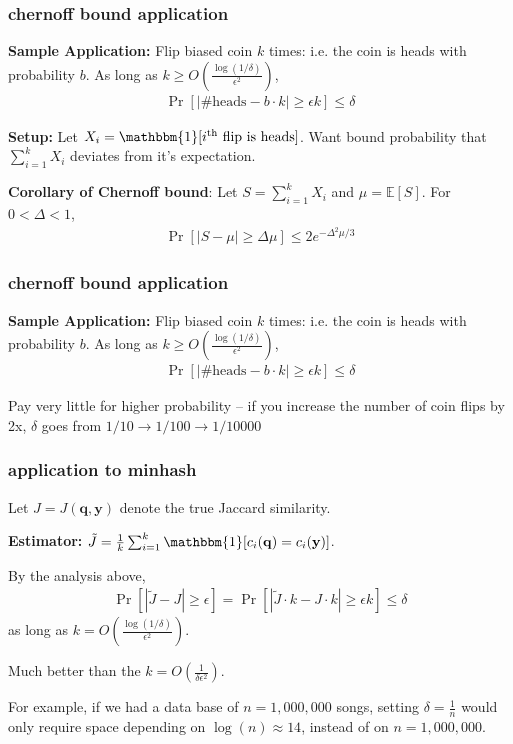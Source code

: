 \documentclass[handout,compress]{beamer}
\newcommand{\bv}[1]{\mathbf{#1}}
\newcommand{\E}{\mathbb{E}}
\begin{document}
\begin{frame}
	\frametitle{chernoff bound application}
	\small
	\textbf{Sample Application:} Flip biased coin $k$ times: i.e. the coin is heads with probability $b$. As long as $k \geq O\left(\frac{\log(1/\delta)}{\epsilon^2}\right)$,
	\vspace{-.5em}
	\begin{align*}
		\Pr[|\text{\# heads} - b\cdot k| \geq \epsilon k] \leq \delta 
	\end{align*}
	
	\textbf{Setup:}
	Let $X_i = \mathbbm{1}[i^\text{th} \text{ flip is heads}]$. Want bound probability that  $\sum_{i=1}^k X_i$ deviates from it's expectation.
	
	\textbf{Corollary of Chernoff bound}: Let $S = \sum_{i=1}^k X_i$ and $\mu = \E[S]$. For $0< \Delta < 1$, 
	\vspace{-.75em}
	\begin{align*}
		\Pr[|S - \mu| \geq \Delta \mu] \leq 2e^{-\Delta^2 \mu/3}
	\end{align*} 
\vspace{6em}
\end{frame}

\begin{frame}
	\frametitle{chernoff bound application}
	\textbf{Sample Application:} Flip biased coin $k$ times: i.e. the coin is heads with probability $b$. As long as $k \geq O\left(\frac{\log(1/\delta)}{\epsilon^2}\right)$,
	\begin{align*}
		\Pr[|\text{\# heads} - b\cdot k| \geq \epsilon k] \leq \delta 
	\end{align*}
	
	
	
	Pay very little for higher probability -- if you increase the number of coin flips by 2x, $\delta$ goes from $1/10 \rightarrow 1/100 \rightarrow 1/10000$
\end{frame}

\begin{frame}
	\frametitle{application to minhash}
	Let $J = J(\bv{q},\bv{y})$ denote the true Jaccard similarity.
	
	\textbf{Estimator:} $\tilde{J} = \frac{1}{k} \sum_{i=1}^k \mathbbm{1}[c_i(\bv{q}) = c_i(\bv{y})]$. 
	
	By the analysis above,
	\begin{align*}
		\Pr[|\tilde{J} - J| \geq \epsilon] = \Pr[|\tilde{J} \cdot k - J\cdot k| \geq \epsilon k] \leq \delta 
	\end{align*} 
	as long as $k = O\left(\frac{\log(1/\delta)}{\epsilon^2}\right)$. 
	
	Much better than the $k = O\left(\frac{1}{\delta\epsilon^2}\right)$.
	
	For example, if we had a data base of $n=1,000,000$ songs, setting $\delta = \frac{1}{n}$ would only require space depending on $\log(n) \approx 14$, instead of on $n=1,000,000$.  
	
\end{frame}
\end{document}
